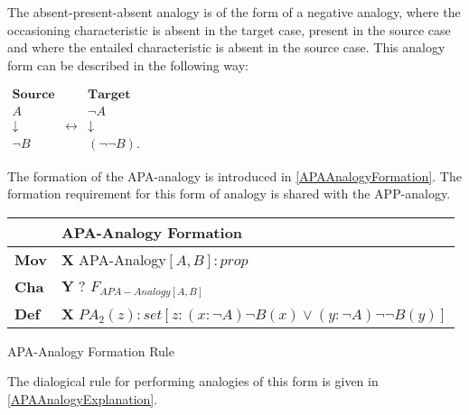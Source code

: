 				The absent-present-absent analogy is of the form of a negative analogy, where the occasioning characteristic is absent in  the target case, present in the source case and where the entailed characteristic is absent in the source case. This analogy form can be described in the following way:
                	\begin{table}[H]
                	\centering	
                	$
                    \begin{array}{ccc}
                    	\textbf{Source} &                 & \textbf{Target} \\
                    	A               &  & \neg A          \\
                    	\downarrow      & \leftrightarrow & \downarrow      \\
                    	\neg B          &  & (\neg \neg B).
                    \end{array}
               	 	$
               	 	\end{table}
               	 The formation of the APA-analogy is introduced in \autoref{APAAnalogyFormation}. The formation requirement for this form of analogy is shared with the APP-analogy. 
               	 	
               		\begin{Scheme}[H]\footnotesize
               		\centering
               		\begin{tabular}{l l}
               			                   & \textbf{APA-Analogy Formation} \\ \toprule
               			\textbf{Mov}      & \textbf{X} APA-Analogy$[A,B] : prop$ \\ \midrule
               			\textbf{Cha} & \textbf{Y} ? $F_{APA-Analogy[A,B]}$ \\ \midrule
               			\textbf{Def}   & \textbf{X} $PA_2(z) : set [z : (x : \neg A) \neg B(x) \lor (y : \neg A) \neg \neg B(y)]$ \\ \bottomrule
               		\end{tabular}
               		\caption{APA-Analogy Formation Rule}
               		\label{APAAnalogyFormation}
					\end{Scheme} 	
               	 	
               	\noindent  The dialogical rule for performing analogies of this form is given in \autoref{APAAnalogyExplanation}.
					
